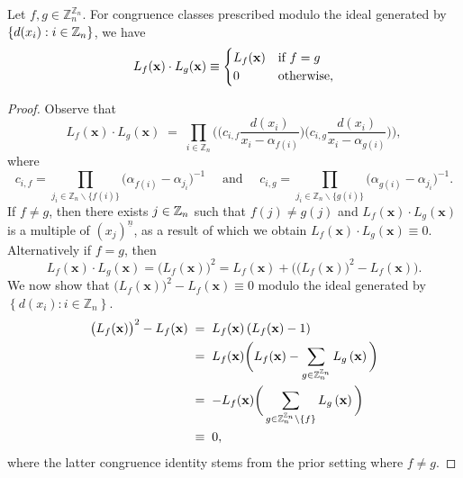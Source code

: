 \begin{proposition}
 \label{prop:Orthogonality}
 Let $f,g \in\mathbb{Z}_{n}^{\mathbb{Z}_{n}}$. For congruence classes prescribed modulo the ideal generated by $\{d(x_{i}):i \in {\mathbb Z}_n\}$, we have
\[
L_{f}({\bf x})\cdot L_{g}({\bf x})\equiv\begin{cases}
L_{f}({\bf x}) & \text{if }f=g\\
0 & \text{otherwise,}
\end{cases}
\]
\end{proposition}
\begin{proof} Observe that
\[
L_{f}(\mathbf{x})\cdot L_{g}(\mathbf{x})\;=\;\prod_{i\in\mathbb{Z}_{n}}\bigg(\big(c_{i,f}\frac{d(x_{i})}{x_{i}-\alpha_{f(i)}}\big)\big(c_{i,g}\frac{d(x_{i})}{x_{i}-\alpha_{g(i)}}\big)\bigg),
\]
where
\[
c_{i,f}=\prod_{j_{i}\in\mathbb{Z}_{n}\backslash\{f(i)\}}\big(\alpha_{f(i)}-\alpha_{j_{i}}\big)^{-1}\quad\text{ and }\quad c_{i,g}=\prod_{j_{i}\in\mathbb{Z}_{n}\backslash\{g(i)\}}\big(\alpha_{g(i)}-\alpha_{j_{i}}\big)^{-1}.
\]
If $f \neq g$, then there exists $j \in {\mathbb Z}_n$ such that $f(j)\neq g(j)$ and $L_{f}(\mathbf{x})\cdot L_{g}(\mathbf{x})$ is a multiple of $(x_{j})^{\underline{n}}$,
as a result of which we obtain $L_{f}(\mathbf{x})\cdot L_{g}(\mathbf{x}) \equiv 0$. Alternatively if $f = g$, then
\[
L_{f}(\mathbf{x})\cdot L_{g}(\mathbf{x})=\big(L_{f}(\mathbf{x})\big)^{2}=L_{f}(\mathbf{x})+\bigg(\big(L_{f}(\mathbf{x})\big)^{2}-L_{f}(\mathbf{x})\bigg).
\]
We now show that $\big(L_{f}(\mathbf{x})\big)^{2}-L_{f}(\mathbf{x})\equiv 0$ modulo the ideal generated by $\left\{ d(x_{i}):i\in\mathbb{Z}_{n}\right\}$.
\begin{align*}
\big(L_{f}(\mathbf{x})\big)^{2}-L_{f}(\mathbf{x})\; & =\;L_{f}(\mathbf{x})\left(L_{f}(\mathbf{x})-1\right)\\
 & =\;L_{f}(\mathbf{x})\bigg(L_{f}(\mathbf{x})-\sum_{g\in\mathbb{Z}_{n}^{\mathbb{Z}_{n}}}L_{g}\left({\bf x}\right)\bigg)\\
 & =\;-L_{f}(\mathbf{x})\bigg(\sum_{g\in\mathbb{Z}_{n}^{\mathbb{Z}_{n}}\setminus\{f\}}L_{g}\left({\bf x}\right)\bigg)\\
 & \equiv\;0,
\end{align*}
where the latter congruence identity stems from the prior setting where $f\ne g$.
\end{proof}


